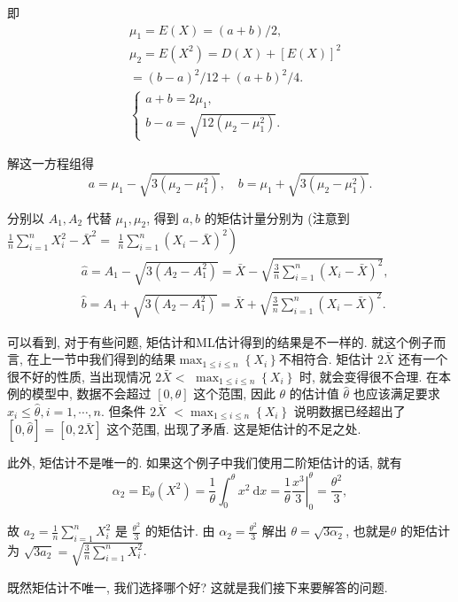 \begin{solution}
    即
    $$
    \begin{aligned}
    & \mu_1=E(X)=(a+b) / 2, \\
    & \mu_2=E\left(X^2\right)=D(X)+[E(X)]^2 \\
    &=(b-a)^2 / 12+(a+b)^2 / 4 . \\
    &\left\{\begin{array}{l}
    a+b=2 \mu_1, \\
    b-a=\sqrt{12\left(\mu_2-\mu_1^2\right)} .
    \end{array}\right.
    \end{aligned}
    $$
    
    解这一方程组得
    $$
    a=\mu_1-\sqrt{3\left(\mu_2-\mu_1^2\right)}, \quad b=\mu_1+\sqrt{3\left(\mu_2-\mu_1^2\right)} .
    $$

    分别以 $A_1, A_2$ 代替 $\mu_1, \mu_2$, 得到 $a, b$ 的矩估计量分别为 (注意到 $\frac{1}{n} \sum_{i=1}^n X_i^2-\bar{X}^2=$ $\left.\frac{1}{n} \sum_{i=1}^n\left(X_i-\bar{X}\right)^2\right)$
$$
\begin{aligned}
& \hat{a}=A_1-\sqrt{3\left(A_2-A_1^2\right)}=\bar{X}-\sqrt{\frac{3}{n} \sum_{i=1}^n\left(X_i-\bar{X}\right)^2}, \\
& \hat{b}=A_1+\sqrt{3\left(A_2-A_1^2\right)}=\bar{X}+\sqrt{\frac{3}{n} \sum_{i=1}^n\left(X_i-\bar{X}\right)^2} .
\end{aligned}
$$
\end{solution}

可以看到, 对于有些问题, 矩估计和ML估计得到的结果是不一样的. 就这个例子而言, 在上一节中我们得到的结果$\max _{1 \leq i \leq n}\left\{X_i\right\}$不相符合. 矩估计 $2 \bar{X}$ 还有一个很不好的性质, 当出现情况 $2 \bar{X}<$ $\max _{1 \leq i \leq n}\left\{X_i\right\}$ 时, 就会变得很不合理. 在本例的模型中, 数据不会超过 $[0, \theta]$ 这个范围, 因此 $\theta$ 的估计值 $\hat{\theta}$ 也应该满足要求 $x_i \leq \hat{\theta}, i=1, \cdots, n$. 但条件 $2 \bar{X}$ $<\max _{1 \leq i \leq n}\left\{X_i\right\}$ 说明数据已经超出了 $[0, \hat{\theta}]=[0,2 \bar{X}]$ 这个范围, 出现了矛盾. 这是矩估计的不足之处.

此外, 矩估计不是唯一的. 如果这个例子中我们使用二阶矩估计的话, 就有
$$
\alpha_2=\mathrm{E}_\theta\left(X^2\right)=\frac{1}{\theta} \int_0^\theta x^2 \mathrm{~d} x=\left.\frac{1}{\theta} \frac{x^3}{3}\right|_0 ^\theta=\frac{\theta^2}{3},
$$

故 $a_2=\frac{1}{n} \sum_{i=1}^n X_i^2$ 是 $\frac{\theta^2}{3}$ 的矩估计. 由 $\alpha_2=\frac{\theta^2}{3}$ 解出 $\theta=\sqrt{3 \alpha_2}$, 也就是$\theta$ 的矩估计为 $\sqrt{3 a_2}=\sqrt{\frac{3}{n} \sum_{i=1}^n X_i^2}$.

既然矩估计不唯一, 我们选择哪个好? 这就是我们接下来要解答的问题.  